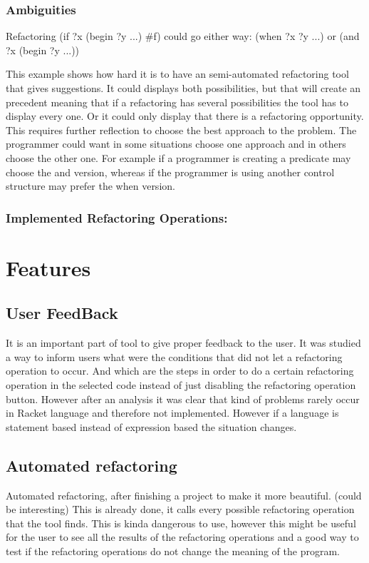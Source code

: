 \subsubsection{Ambiguities}
Refactoring (if ?x (begin ?y ...) \#f) could go either way:
(when ?x ?y ...)
or
(and ?x (begin ?y ...))

This example shows how hard it is to have an semi-automated refactoring tool
that gives suggestions. It could displays both possibilities, but that will
create an precedent meaning that if a refactoring has several possibilities the
tool has to display every one. Or it could only display that there is a
refactoring opportunity. This requires further reflection to choose the best
approach to the problem.
The programmer could want in some situations choose one approach and in others
choose the other one. For example if a programmer is creating a predicate may
choose the and version, whereas if the programmer is using another control structure
may prefer the when version.

\subsubsection{Implemented Refactoring Operations:}

\section{Features}

\subsection{User FeedBack}
It is an important part of tool to give proper feedback to the user. It was studied
a way to inform users what were the conditions that did not let a refactoring operation
to occur. And which are the steps in order to do a certain refactoring
operation in the selected code instead of just disabling the refactoring operation
button. However after an analysis it was clear that kind of problems rarely occur
in Racket language and therefore not implemented. However if a language is statement
based instead of expression based the situation changes.

\subsection{Automated refactoring}
Automated refactoring, after finishing a project to make it more beautiful. (could be interesting)
This is already done, it calls every possible refactoring operation that the tool finds.
This is kinda dangerous to use, however this might be useful for the user to see all the results of the refactoring operations
and a good way to test if the refactoring operations do not change the meaning of the program.

